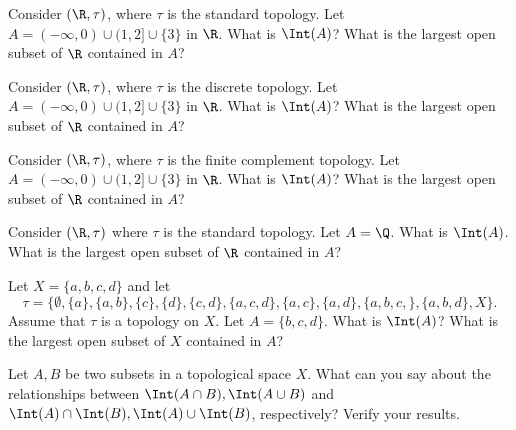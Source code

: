 \begin{pa} 
\be
\item Consider $(\R, \tau)$, where $\tau$ is the standard topology. Let $A=(-\infty,0)\cup (1,2]\cup \{3\}$ in $\R$. What is $\Int(A)$? What is the largest open subset of $\R$ contained in $A$?

\item Consider $(\R, \tau)$, where $\tau$ is the discrete topology. Let $A=(-\infty,0) \cup (1,2] \cup \{3\}$ in $\R$. What is $\Int(A)$? What is the largest open subset of $\R$ contained in $A$?

\item Consider $(\R, \tau)$, where $\tau$ is the finite complement topology. Let $A=(-\infty,0) \cup (1,2] \cup \{3\}$ in $\R$. What is $\Int(A)$? What is the largest open subset of $\R$ contained in $A$?

\item Consider $(\R, \tau)$ where $\tau$ is the standard topology. Let $A = \Q$. What is $\Int(A)$. What is the largest open subset of $\R$ contained in $A$?

\item Let $X = \{a,b,c,d\}$ and let 
\[\tau = \{\emptyset, \{a\}, \{a,b\}, \{c\}, \{d\}, \{c,d\}, \{a,c,d\}, \{a,c\}, \{a,d\}, \{a,b,c,\}, \{a,b,d\}, X\}.\]
Assume that $\tau$ is a topology on $X$. Let $A = \{b,c,d\}$. What is $\Int(A)$? What is the largest open subset of $X$ contained in $A$?

\item Let $A, B$ be two subsets in a topological space $X$. What can you say about the relationships between $\Int(A\cap B), \Int(A\cup B)$ and $\Int(A)\cap \Int(B), \Int(A)\cup \Int(B)$, respectively? Verify your results.

\ee

\end{pa}

